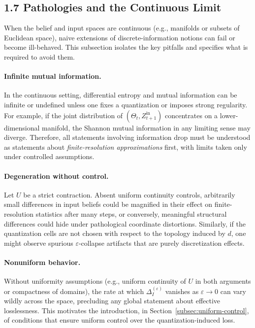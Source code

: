 \documentclass[12pt]{article}
\theoremstyle{definition}
\theoremstyle{plain}
\begin{document}
\subsection*{1.7 Pathologies and the Continuous Limit}

When the belief and input spaces are continuous (e.g., manifolds or subsets of Euclidean space), naive extensions of discrete-information notions can fail or become ill-behaved. This subsection isolates the key pitfalls and specifies what is required to avoid them.

\paragraph{Infinite mutual information.}  
In the continuous setting, differential entropy and mutual information can be infinite or undefined unless one fixes a quantization or imposes strong regularity.  For example, if the joint distribution of \((\Theta_t, Z^{\mathrm{in}}_{t+1})\) concentrates on a lower-dimensional manifold, the Shannon mutual information in any limiting sense may diverge.  Therefore, all statements involving information drop must be understood as statements about \emph{finite-resolution approximations} first, with limits taken only under controlled assumptions.

\paragraph{Degeneration without control.}  
Let \(U\) be a strict contraction.  Absent uniform continuity controls, arbitrarily small differences in input beliefs could be magnified in their effect on finite-resolution statistics after many steps, or conversely, meaningful structural differences could hide under pathological coordinate distortions.  Similarly, if the quantization cells are not chosen with respect to the topology induced by \(d\), one might observe spurious \(\varepsilon\)-collapse artifacts that are purely discretization effects.

\paragraph{Nonuniform behavior.}  
Without uniformity assumptions (e.g., uniform continuity of \(U\) in both arguments or compactness of domains), the rate at which \(\Delta_I^{(\varepsilon)}\) vanishes as \(\varepsilon \to 0\) can vary wildly across the space, precluding any global statement about effective losslessness.  This motivates the introduction, in Section~\ref{subsec:uniform-control}, of conditions that ensure uniform control over the quantization-induced loss.
\end{document}
